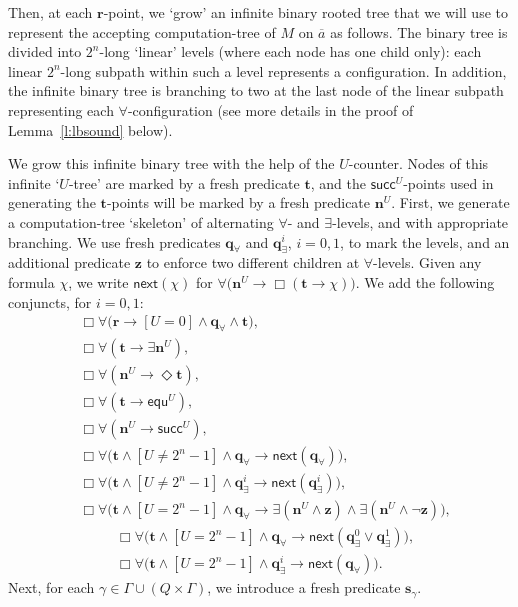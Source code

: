 \documentclass{lmcs} %
\theoremstyle{plain}\newtheorem{satz}[thm]{Satz} %
\newcommand{\fform}[1]{\boldsymbol{#1}}
\newcommand{\qvar}{\fform{q}}
\newcommand{\svar}{\fform{s}}
\newcommand{\Zvar}{\fform{z}}
\newcommand{\cU}{U}
\newcommand{\cvf}[3]{[{#1}\mathop{#2}{#3}]}
\newcommand{\inpw}{\overline{a}}
\newcommand{\nextU}{\fform{n}^\cU}
\newcommand{\Bv}{\forall}
\newcommand{\Bh}{\Box}
\newcommand{\Dv}{\exists}
\newcommand{\Dh}{\Diamond}
\newcommand{\start}{\fform{r}}
\newcommand{\nextt}[1]{\mathsf{next}({#1})}
\newcommand{\grid}{\mathsf{equ}}
\newcommand{\scc}{\mathsf{succ}}
\newcommand{\tree}{\fform{t}}
\newcommand{\qA}{\qvar_\forall}
\newcommand{\qE}{\qvar_\exists}
\begin{document}
	Then, at each $\start$-point, we `grow' an infinite binary rooted tree that we will use to represent the accepting computation-tree of $M$ on $\inpw$ as follows. The binary tree is divided into $2^n$-long `linear' levels
	(where each node has one child only): each linear $2^n$-long subpath within such a level represents a configuration.
	In addition, the infinite binary tree is branching to two at the last node of the linear subpath representing each $\forall$-configuration (see more details in the proof of Lemma~\ref{l:lbsound} below).
	
	We grow this infinite binary tree with the help of the $\cU$-counter.
	Nodes of this infinite `$\cU$-tree' are marked by a fresh predicate $\tree$, and
	the $\scc^\cU$-points used in generating the $\tree$-points will be marked by a fresh predicate $\nextU$.
	First, we generate a computation-tree `skeleton' of alternating $\forall$- and $\exists$-levels, and with appropriate branching. We use fresh predicates $\qA$ and $\qE^i$, $i=0,1$, to mark the levels, and an additional predicate $\Zvar$
	to enforce two different children at $\forall$-levels.
	Given any formula $\chi$, we write $\nextt{\chi}$ for
	$\Bv\bigl(\nextU\to\Bh(\tree\to\chi)\bigr)$. We add the following conjuncts, for $i=0,1$:
	\begin{align}
		\label{Utreefirst}
		& \Bh\Bv\bigl(\start\to \cvf{\cU}{=}{0}\land\qA\land\tree\bigr),\\
		& \Bh\Bv (\tree\to \Dv\nextU),\\
		& \Bh\Bv (\nextU\to\Dh\tree),\\
		& \Bh\Bv(\tree\to\grid^\cU),\\
		& \Bh\Bv(\nextU\to\scc^\cU),\\
		& \Bh\Bv\bigl(\tree\land \cvf{\cU}{\ne}{2^n-1}\land\qA\to\nextt{\qA}\bigr),\\
		& \Bh\Bv\bigl(\tree\land \cvf{\cU}{\ne}{2^n-1}\land\qE^i\to\nextt{\qE^i}\bigr),\\
		& \Bh\Bv\bigl(\tree\land \cvf{\cU}{=}{2^n-1}\land\qA 
		\to\Dv(\nextU\land\Zvar)\land\Dv(\nextU\land\neg\Zvar)\bigr),%
	\end{align}
%	
	\begin{align}
		& \Bh\Bv\bigl(\tree\land\cvf{\cU}{=}{2^n-1}\land\qA\to\nextt{\qE^0\lor\qE^1}\bigr),\\
		\label{Utreelast}
		& \Bh\Bv\bigl(\tree\land\cvf{\cU}{=}{2^n-1}\land\qE^i\to\nextt{\qA}\bigr).
	\end{align}
	Next, for each $\gamma\in\Gamma\cup(Q\times\Gamma)$, we introduce a fresh predicate $\svar_\gamma$. 
\end{document}
